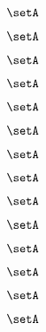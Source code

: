 {\begin{forslides}
    \begin{equation}
        \label{eq:parallelism-176}
        \setA
    \end{equation}

    \begin{equation}
        \label{eq:parallelism-177}
        \setA
    \end{equation}

    \begin{equation}
        \label{eq:parallelism-178}
        \setA
    \end{equation}

    \begin{equation}
        \label{eq:parallelism-179}
        \setA
    \end{equation}

    \begin{equation}
        \label{eq:parallelism-180}
        \setA
    \end{equation}

    \begin{equation}
        \label{eq:parallelism-181}
        \setA
    \end{equation}

    \begin{equation}
        \label{eq:parallelism-182}
        \setA
    \end{equation}

    \begin{equation}
        \label{eq:parallelism-183}
        \setA
    \end{equation}

    \begin{equation}
        \label{eq:parallelism-184}
        \setA
    \end{equation}

    \begin{equation}
        \label{eq:parallelism-185}
        \setA
    \end{equation}

    \begin{equation}
        \label{eq:parallelism-186}
        \setA
    \end{equation}

    \begin{equation}
        \label{eq:parallelism-187}
        \setA
    \end{equation}

    \begin{equation}
        \label{eq:parallelism-188}
        \setA
    \end{equation}

    \begin{equation}
        \label{eq:parallelism-189}
        \setA
    \end{equation}
    

\end{forslides}
}